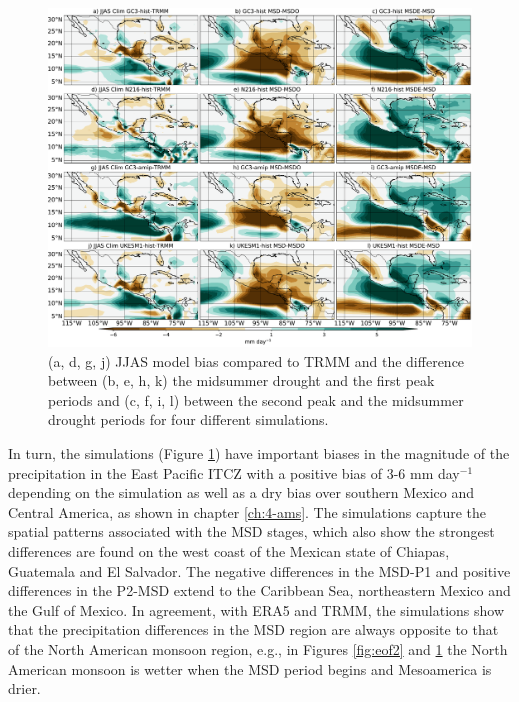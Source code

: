 \begin{figure}[t!]
\includegraphics[width=\linewidth]{figures/fig2obs_prmodels3}
\caption[Composite mean precipitation biases and seasonal variations]{ (a, d, g, j) JJAS model bias compared to TRMM and the difference between  (b, e, h, k)  the midsummer drought and the first peak periods and (c, f, i, l)  between the second peak and the midsummer drought periods for four different simulations.}
\label{fig:model_pr}
\end{figure} 
 
 In turn, the simulations (Figure \ref{fig:model_pr}) have important biases in the magnitude of the  precipitation in the East Pacific ITCZ with a positive bias of 3-6 mm day$^{-1}$ depending on the simulation as well as a dry bias over southern Mexico and Central America, as shown in chapter \ref{ch:4-ams}.
The simulations capture the spatial patterns associated with the MSD stages, which also show the strongest differences are found on the west coast of the Mexican state of Chiapas, Guatemala and El Salvador. The negative differences in the MSD-P1 and positive differences in the P2-MSD extend to the Caribbean Sea, northeastern Mexico and the Gulf of Mexico. 
In agreement, with ERA5 and TRMM, the simulations show that the precipitation differences in the MSD region are always opposite to that of the North American monsoon region, e.g., in Figures \ref{fig:eof2} and \ref{fig:model_pr} the North American monsoon is wetter when the MSD period begins and Mesoamerica is drier.
  
 
 
